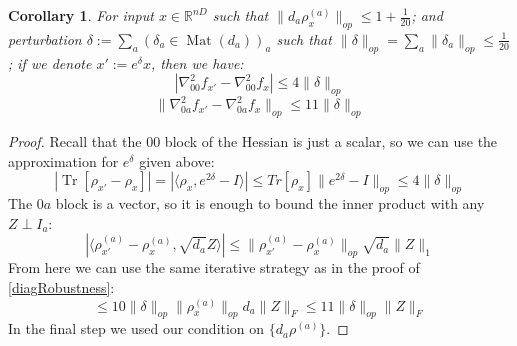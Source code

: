 \documentclass[aos]{imsart}
\newtheorem{corollary}[theorem]{Corollary}
\theoremstyle{definition}
\numberwithin{equation}{section}
\DeclareMathOperator{\mat}{Mat}
\DeclareMathOperator{\tr}{Tr}
\newcommand{\R}{{\mathbb{R}}}
\newcommand{\samp}{x}
\newcommand{\AR}[1]{{\color{orange}[AR: #1]}}
\begin{document}
\begin{appendix}
\begin{corollary} \label{constantRobustness}
For input $\samp \in \R^{nD}$ such that $\|d_{a} \rho_{\samp}^{(a)}\|_{op} \leq 1 + \frac{1}{20}$; and perturbation $\delta := \sum_{a} (\delta_{a} \in \mat(d_{a}))_{a}$ such that $\|\delta\|_{op} = \sum_{a} \|\delta_{a}\|_{op} \leq \frac{1}{20}$; if we denote $\samp' := e^{\delta} \samp$, then we have:
\[ |\nabla^{2}_{00} f_{\samp'} - \nabla^{2}_{00} f_{\samp}| \leq 4 \|\delta\|_{op}     \]
\[ \|\nabla^{2}_{0a} f_{\samp'} - \nabla^{2}_{0a} f_{\samp}\|_{op} \leq 11 \|\delta\|_{op}    \]
\end{corollary}
\begin{proof}
Recall that the $00$ block of the Hessian is just a scalar, so we can use the approximation for $e^{\delta}$ given above:
\[ |\tr[\rho_{\samp'} - \rho_{\samp}]| = |\langle \rho_{\samp}, e^{2\delta} - I \rangle| \leq Tr[\rho_{x}] \|e^{2 \delta} - I\|_{op} \leq 4 \|\delta\|_{op}     \]
The $0a$ block is a vector, so it is enough to bound the inner product with any $Z \perp I_{a}$:
\[ |\langle \rho_{\samp'}^{(a)} - \rho_{\samp}^{(a)}, \sqrt{d_{a}} Z \rangle| \leq \|\rho_{\samp'}^{(a)} - \rho_{\samp}^{(a)}\|_{op} \sqrt{d_{a}} \|Z\|_{1} \]
From here we can use the same iterative strategy as in the proof of \cref{diagRobustness}:
\[ \leq 10 \|\delta\|_{op} \|\rho^{(a)}_{\samp}\|_{op} d_{a} \|Z\|_{F} \leq 11 \|\delta\|_{op} \|Z\|_{F}   \]
In the final step we used our condition on $\{d_{a} \rho^{(a)}\}$.
\end{proof}


\end{appendix}
\end{document}
